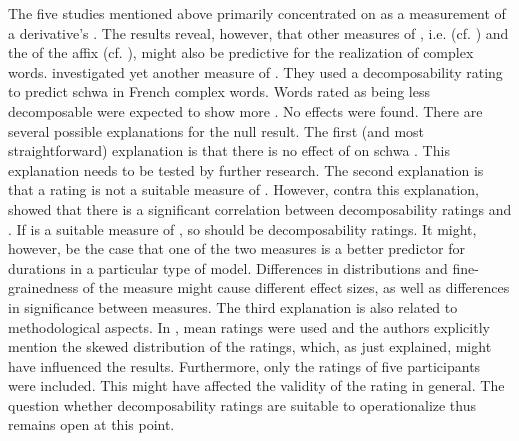 The five studies mentioned above primarily concentrated on  as a measurement of a derivative's . The results reveal, however, that other measures of , i.e.  (cf. \citealt{Hanique.2011}) and the  of the affix (cf. \citealt{Hay.2007}), might also be predictive for the realization of complex words.  
\cite{Burki.2011} investigated yet another measure of . They used a decomposability rating to predict schwa  in French complex words. Words rated as being less decomposable were expected to show more . No effects were found. There are several possible explanations for the null result. 
The first (and most straightforward) explanation is that there is no effect of  on schwa . This explanation needs to be tested by further research. 
The second explanation is that a rating is not a suitable measure of . However, contra this explanation, \cite{Hay.2001,Hay.2003} showed that there is a significant correlation between decomposability ratings and . If  is a suitable measure of , so should be decomposability ratings. It might, however, be the case that one of the two measures is a better predictor for durations in a particular type of model.  Differences in distributions and fine-grainedness of the measure might cause different effect sizes, as well as differences in significance between measures.   
The third explanation is also related to methodological aspects. In \cite{Burki.2011}, mean ratings were used and the authors explicitly mention the skewed distribution of the ratings, which, as just explained, might have influenced the results. Furthermore, only the ratings of five participants were included. This might have affected the validity of the rating in general. 
The question whether decomposability ratings are suitable to operationalize  thus remains open at this point.


